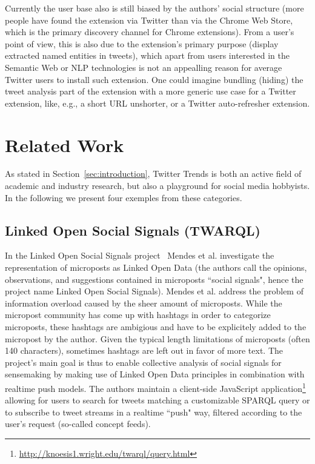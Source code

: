 \documentclass[runningheads,a4paper]{llncs}
\begin{document}
Currently the user base also is still biased by the authors' social structure (more people have found the extension via Twitter than via the Chrome Web Store, which is the primary discovery channel for Chrome extensions). From a user's point of view, this is also due to the extension's primary purpose (display extracted named entities in tweets), which apart from users interested in the Semantic Web or NLP technologies is not an appealling reason for average Twitter users to install such extension. One could imagine bundling (hiding) the tweet analysis part of the extension with a more generic use case for a Twitter extension, like, e.g., a short URL unshorter, or a Twitter auto-refresher extension.

\section{Related Work}\label{sec:relatedwork}
As stated in Section~\ref{sec:introduction}, Twitter Trends is both an active field of academic and industry research, but also a playground for social media hobbyists. In the following we present four exemples from these categories.

\subsection{Linked Open Social Signals (TWARQL)}
In the Linked Open Social Signals project~\cite{Mendes:LOSS} Mendes et al. investigate the representation of microposts as Linked Open Data (the authors call the opinions, observations, and suggestions contained in microposts ``social signals", hence the project name Linked Open Social Signals). Mendes et al. address the problem of information overload caused by the sheer amount of microposts. While the micropost community has come up with hashtags in order to categorize microposts, these hashtags are ambigious and have to be explicitely added to the micropost by the author. Given the typical length limitations of microposts (often 140 characters), sometimes hashtags are left out in favor of more text. The project's main goal is thus to enable collective analysis of social signals for sensemaking by making use of Linked Open Data principles in combination with realtime push models. The authors maintain a client-side JavaScript application\footnote{\url{http://knoesis1.wright.edu/twarql/query.html}} allowing for users to search for tweets matching a customizable SPARQL query or to subscribe to tweet streams in a realtime ``push" way, filtered according to the user's request (so-called concept feeds).
\end{document}
